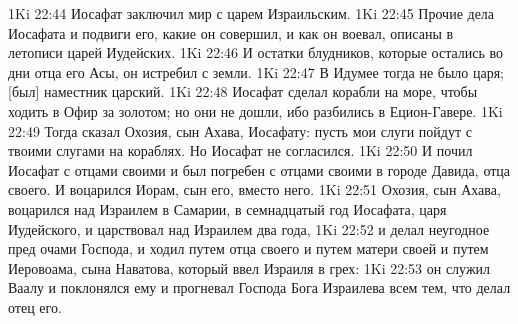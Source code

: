 1Ki 22:44  Иосафат заключил мир с царем Израильским.
1Ki 22:45  Прочие дела Иосафата и подвиги его, какие он совершил, и как он воевал, описаны в летописи царей Иудейских.
1Ki 22:46  И остатки блудников, которые остались во дни отца его Асы, он истребил с земли.
1Ki 22:47  В Идумее тогда не было царя; [был] наместник царский.
1Ki 22:48  Иосафат сделал корабли на море, чтобы ходить в Офир за золотом; но они не дошли, ибо разбились в Ецион-Гавере.
1Ki 22:49  Тогда сказал Охозия, сын Ахава, Иосафату: пусть мои слуги пойдут с твоими слугами на кораблях. Но Иосафат не согласился.
1Ki 22:50  И почил Иосафат с отцами своими и был погребен с отцами своими в городе Давида, отца своего. И воцарился Иорам, сын его, вместо него.
1Ki 22:51  Охозия, сын Ахава, воцарился над Израилем в Самарии, в семнадцатый год Иосафата, царя Иудейского, и царствовал над Израилем два года,
1Ki 22:52  и делал неугодное пред очами Господа, и ходил путем отца своего и путем матери своей и путем Иеровоама, сына Наватова, который ввел Израиля в грех:
1Ki 22:53  он служил Ваалу и поклонялся ему и прогневал Господа Бога Израилева всем тем, что делал отец его.


